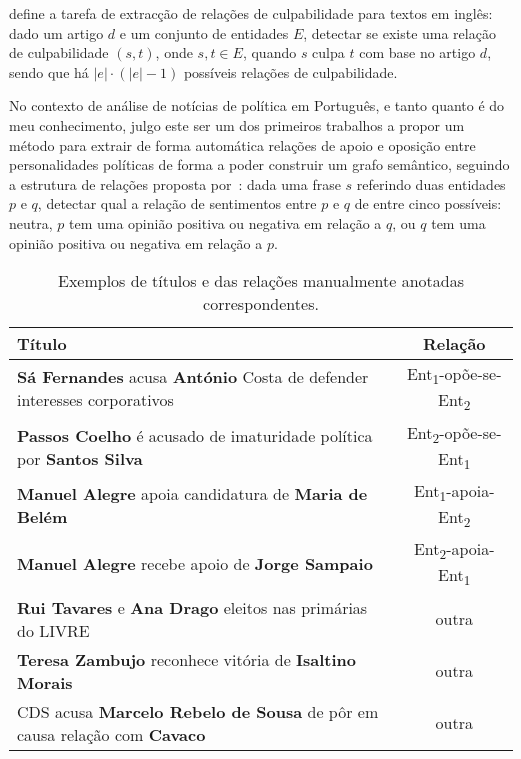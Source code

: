 \documentclass[a4paper, twocolumn, 11pt, twoside]{article}
\begin{document}
\cite{liang2019blames} define a tarefa de extracção de relações de culpabilidade para textos em inglês: dado um artigo $d$ e um conjunto de entidades $E$, detectar se existe uma relação de culpabilidade $(s,t)$, onde $s,t \in E$, quando $s$ culpa $t$ com base no artigo $d$, sendo que há $|e| \cdot (|e| - 1)$ possíveis relações de culpabilidade.

No contexto de análise de notícias de política em Português, e tanto quanto é do meu conhecimento, julgo este ser um dos primeiros trabalhos a propor um método para extrair de forma automática relações de apoio e oposição entre personalidades políticas de forma a poder construir um grafo semântico, seguindo a estrutura de relações proposta por~\cite{park-etal-2021-blames}: dada uma frase $s$ referindo duas entidades $p$ e $q$, detectar qual a relação de sentimentos entre $p$ e $q$ de entre cinco possíveis: neutra, $p$ tem uma opinião positiva ou negativa em relação a $q$, ou $q$ tem uma opinião positiva ou negativa em relação a $p$.

\begin{table*}[!h]
  \centering
  \begin{tabular}{lc}
      {\bf Título} & {\bf Relação} \\
      \hline
	  \textbf{Sá Fernandes} acusa \textbf{António} Costa de defender interesses corporativos &	Ent\textsubscript{1}-opõe-se-Ent\textsubscript{2} \\
	  \textbf{Passos Coelho} é acusado de imaturidade política por \textbf{Santos Silva} &	Ent\textsubscript{2}-opõe-se-Ent\textsubscript{1}	\\
	  \textbf{Manuel Alegre} apoia candidatura de \textbf{Maria de Belém} &	Ent\textsubscript{1}-apoia-Ent\textsubscript{2}	\\
	  \textbf{Manuel Alegre} recebe apoio de \textbf{Jorge Sampaio} & Ent\textsubscript{2}-apoia-Ent\textsubscript{1}	\\
	  \textbf{Rui Tavares} e \textbf{Ana Drago} eleitos nas primárias do LIVRE & outra	\\
	  \textbf{Teresa Zambujo} reconhece vitória de \textbf{Isaltino Morais} & outra	\\
	  CDS acusa \textbf{Marcelo Rebelo de Sousa} de pôr em causa relação com \textbf{Cavaco} & outra \\
	  \hline
  \end{tabular}
  \caption{Exemplos de títulos e das relações manualmente anotadas correspondentes.}
  \label{tab:samples}
\end{table*}
\end{document}
